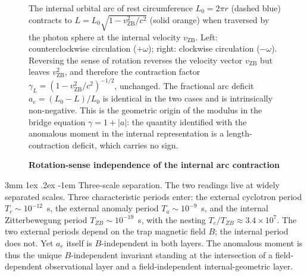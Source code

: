 \documentclass[%
 reprint, amsmath,amssymb, aps, prb, ]{revtex4-2}
\makeatletter
\numberwithin{equation}{section}
\renewcommand\paragraph{%
  \@startsection{paragraph}{4}{\z@}%
    {3mm \@plus 1ex \@minus .2ex}%
    {-1em}%
    {\normalfont\normalsize\itshape}}
\newcommand{\vZB}{v_{\text{ZB}}}
\newcommand{\gammaL}{\gamma_{L}}
\makeatother
\begin{document}
\begin{figure}[t!]
\begin{tikzpicture}[>=Stealth, font=\small]
\end{tikzpicture}
\caption{\textbf{Rotation-sense independence of the internal arc contraction}}
\label{fig:arc_modulus}
\vspace{0.4em}
\begin{minipage}{0.95\textwidth}
\justifying\small
The internal orbital arc of rest circumference $L_0 = 2\pi r$ (dashed blue) contracts to $L = L_0\sqrt{1-\vZB^2/c^2}$ (solid orange) when traversed by the photon sphere at the internal velocity $\vZB$. Left: counterclockwise circulation ($+\omega$); right: clockwise circulation ($-\omega$). Reversing the sense of rotation reverses the velocity vector $\vZB$ but leaves $\vZB^2$, and therefore the contraction factor $\gammaL = (1-\vZB^2/c^2)^{-1/2}$, unchanged. The fractional arc deficit $a_e = (L_0-L)/L_0$ is identical in the two cases and is intrinsically non-negative. This is the geometric origin of the modulus in the bridge equation $\gamma = 1 + \lvert a\rvert$: the quantity identified with the anomalous moment in the internal representation is a length-contraction deficit, which carries no sign.
\end{minipage}
\end{figure}

\paragraph{Three-scale separation.}
The two readings live at widely separated scales. Three characteristic periods enter: the external cyclotron period $T_c \sim 10^{-12}$~s, the external anomaly period $T_a \sim 10^{-9}$~s, and the internal Zitterbewegung period $T_{ZB} \sim 10^{-19}$~s, with the nesting $T_c/T_{ZB} \approx 3.4\times10^{7}$. The two external periods depend on the trap magnetic field $B$; the internal period does not. Yet $a_e$ itself is $B$-independent in both layers. The anomalous moment is thus the unique $B$-independent invariant standing at the intersection of a field-dependent observational layer and a field-independent internal-geometric layer.
\end{document}
